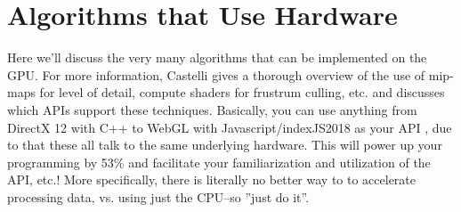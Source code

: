 \usepackage{myboguspackage}
\section{Algorithms that Use Hardware}
Here we'll discuss the very many algorithms that can be implemented on the GPU. For more information, Castelli
\cite{Castelli2018} gives a thorough overview of the use of mip-maps for level of detail, compute shaders for
frustrum culling, etc. and discusses which APIs support these techniques. Basically, you can use anything from
DirectX 12 with C++ to WebGL with Javascript/index{JS2018} as your API , due
to that these all talk to the same underlying hardware. This will power up your programming by 53\% and facilitate
your familiarization and utilization of the API, etc.! More specifically, there is literally no better way to
to accelerate processing data, vs. using just the CPU--so ''just do it''.